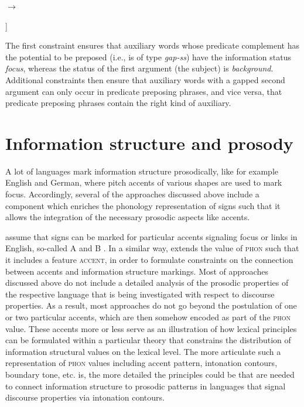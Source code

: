 \documentclass[output=paper]{langsci/langscibook}
\begin{document}
\bigskip
\begin{avm}
  \end{avm}
$\to$\ 
\begin{avm}
  [\tp{hd-fill-ph}\\
    non-hd-dtr & [ss|status & bg]]
\end{avm}
  

  \label{fig:predicatepreposing}
\z
The first constraint ensures that auxiliary words whose predicate
complement has the potential to be preposed (i.e., is of type \textit{gap-ss}) have the
information status \textit{focus}, whereas the status of the first
argument (the subject) is \textit{background}. Additional constraints
then ensure that auxiliary words with a gapped second argument can
only occur in predicate preposing phrases, and vice versa, that
predicate preposing phrases contain the right kind of auxiliary.

\section{Information structure and prosody}
\label{sec:prosody}
A lot of languages mark information structure  prosodically, like for
example English and German, where pitch accents of various shapes are
used to mark focus. Accordingly, several of the approaches discussed above
include a component which enriches the phonology representation
of signs such that it allows the integration of the necessary prosodic
aspects like accents.

\cite{EV96a} assume that signs can be marked for particular accents
signaling focus or links in English, so-called A and B \isi{accents}.
In a similar way, \cite{deKuthy2002a} extends the value of
 \textsc{phon} such that it includes a feature
 \textsc{accent}, in order to formulate constraints on
the connection between accents and information structure markings.
Most of approaches discussed above do not include a detailed analysis
of the prosodic properties of the respective language that is being
investigated with respect to discourse properties. As a result, most
approaches do not go beyond the postulation of one or two particular
accents, which are then somehow encoded as part of the \textsc{phon}
value. These accents more or less serve as an illustration of how lexical
principles can be formulated within a particular theory that constrains
the distribution of information structural values on the lexical
level. The more articulate such a representation of \textsc{phon}
values including accent pattern, intonation contours, boundary tone,
etc. is, the more detailed the principles could be that are needed to
connect information structure to prosodic patterns in languages that
signal discourse properties via intonation contours.
\end{document}
